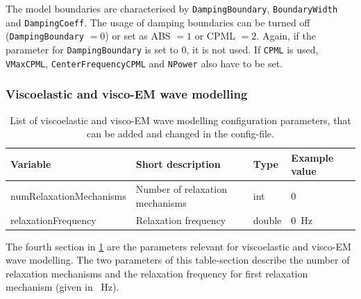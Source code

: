 \documentclass[pdftex,a4paper,parskip,listof=totoc,bibliography=totoc,onehalfspacing,12pt]{scrreprt}
\begin{document}
The model boundaries are characterised by \verb+DampingBoundary+, \verb+BoundaryWidth+ and \verb+DampingCoeff+. 
The usage of damping boundaries can be turned off (\verb+DampingBoundary+ $=0$) or set as ABS $=1$ or CPML $=2$. Again, if the parameter for \verb+DampingBoundary+ is set to 0, it is not used. 
If \verb+CPML+ is used, \verb+VMaxCPML+, \verb+CenterFrequencyCPML+ and \verb+NPower+ also have to be set. 

\subsubsection{Viscoelastic and visco-EM wave modelling}
\begin{table}[h!]
\caption[List of viscoelastic and visco-EM wave modelling configuration parameters.]{List of viscoelastic and visco-EM wave modelling configuration parameters, that can be added and changed in the config-file.}\label{tab:config_visco}
\centering
\begin{adjustbox}{width=1\textwidth,center=\textwidth}
	\begin{tabular}{llll}
	\toprule
	Variable & Short description & Type & Example value \\
	\midrule
	numRelaxationMechanisms & Number of relaxation mechanisms & int & \num{0}\\
	relaxationFrequency& Relaxation frequency& double & \SI{0}{Hz}\\
	\bottomrule
	\end{tabular}
	\end{adjustbox}
\end{table}
The fourth section in \ref{tab:config_visco} are the parameters relevant for viscoelastic and visco-EM wave modelling. The two parameters of this table-section describe the number of relaxation mechanisms and the relaxation frequency for first relaxation mechanism (given in \SI{}{Hz}).
\end{document}
